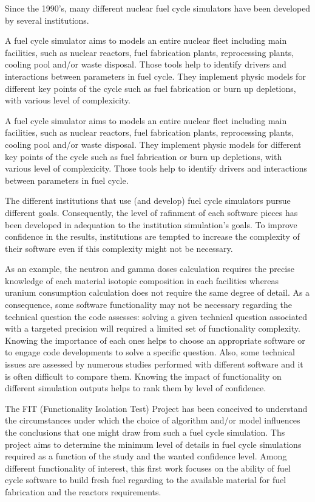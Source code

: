 Since the 1990's, many different nuclear fuel cycle simulators have been
developed by several institutions.

A fuel cycle simulator aims to models an entire nuclear fleet including main
facilities, such as nuclear reactors, fuel fabrication plants, reprocessing
plants, cooling pool and/or waste disposal. Those tools help to identify drivers
and interactions between parameters in fuel cycle. They implement physic models
for different key points of the cycle such as fuel fabrication or burn up
depletions, with various level of complexicity. 

A fuel cycle simulator aims to models an entire nuclear fleet including main
facilities, such as nuclear reactors, fuel fabrication plants, reprocessing
plants, cooling pool and/or waste disposal. They implement physic models for
different key points of the cycle such as fuel fabrication or burn up
depletions, with various level of complexicity. Those tools help to identify
drivers and interactions between parameters in fuel cycle.

The different institutions that use (and develop) fuel cycle simulators pursue
different goals. Consequently, the level of rafinment of each software pieces
has been developed in adequation to the institution simulation's goals. To improve
confidence in the results, institutions are tempted to increase the complexity
of their software even if this complexity might not be necessary.

As an example, the neutron and gamma doses calculation requires the precise
knowledge of each material isotopic composition in each facilities whereas
uranium consumption calculation does not require the same degree of detail. As a
consequence, some software functionality may not be necessary regarding the
technical question the code assesses: solving a given technical question
associated with a targeted precision will required a limited set of
functionality complexity. Knowing the importance of each ones helps to choose an
appropriate software or to engage code developments to solve a specific
question. Also, some technical issues are assessed by numerous studies performed
with different software and it is often difficult to compare them. Knowing the
impact of functionality on different simulation outputs helps to rank them by
level of confidence.

The FIT (Functionality Isolation Test) Project has been conceived to understand
the circumstances under which the choice of algorithm and/or model influences
the conclusions that one might draw from such a fuel cycle simulation. Ths
project aims to determine the minimum level of details in fuel cycle simulations
required as a function of the study and the wanted confidence level. Among
different functionality of interest, this first work focuses on the ability of
fuel cycle software to build fresh fuel regarding to the available material for
fuel fabrication and the reactors requirements.

